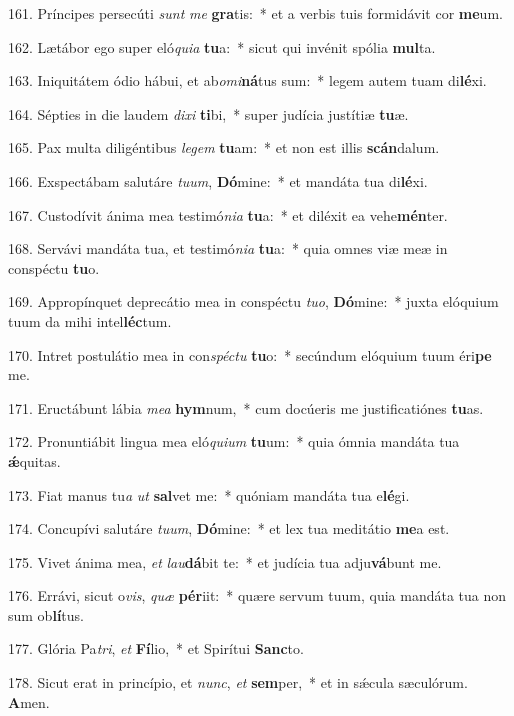161. Príncipes persecúti \textit{sunt} \textit{me} \textbf{gra}tis:~*  et a verbis tuis formidávit cor \textbf{me}um.\

162. Lætábor ego super eló\textit{qui}\textit{a} \textbf{tu}a:~*  sicut qui invénit spólia \textbf{mul}ta.\

163. Iniquitátem ódio hábui, et ab\textit{o}\textit{mi}\textbf{ná}tus sum:~*  legem autem tuam di\textbf{lé}xi.\

164. Sépties in die laudem \textit{di}\textit{xi} \textbf{ti}bi,~*  super judícia justítiæ \textbf{tu}æ.\

165. Pax multa diligéntibus \textit{le}\textit{gem} \textbf{tu}am:~*  et non est illis \textbf{scán}dalum.\

166. Exspectábam salutáre \textit{tu}\textit{um}, \textbf{Dó}mine:~*  et mandáta tua di\textbf{lé}xi.\

167. Custodívit ánima mea testimó\textit{ni}\textit{a} \textbf{tu}a:~*  et diléxit ea vehe\textbf{mén}ter.\

168. Servávi mandáta tua, et testimó\textit{ni}\textit{a} \textbf{tu}a:~*  quia omnes viæ meæ in conspéctu \textbf{tu}o.\

169. Appropínquet deprecátio mea in conspéctu \textit{tu}\textit{o}, \textbf{Dó}mine:~*  juxta elóquium tuum da mihi intel\textbf{léc}tum.\

170. Intret postulátio mea in con\textit{spéc}\textit{tu} \textbf{tu}o:~*  secúndum elóquium tuum éri\textbf{pe} me.\

171. Eructábunt lábia \textit{me}\textit{a} \textbf{hym}num,~*  cum docúeris me justificatiónes \textbf{tu}as.\

172. Pronuntiábit lingua mea eló\textit{qui}\textit{um} \textbf{tu}um:~*  quia ómnia mandáta tua \textbf{ǽ}quitas.\

173. Fiat manus tu\textit{a} \textit{ut} \textbf{sal}vet me:~*  quóniam mandáta tua e\textbf{lé}gi.\

174. Concupívi salutáre \textit{tu}\textit{um}, \textbf{Dó}mine:~*  et lex tua meditátio \textbf{me}a est.\

175. Vivet ánima mea, \textit{et} \textit{lau}\textbf{dá}bit te:~*  et judícia tua adju\textbf{vá}bunt me.\

176. Errávi, sicut o\textit{vis}, \textit{quæ} \textbf{pér}iit:~*  quære servum tuum, quia mandáta tua non sum ob\textbf{lí}tus.\

177. Glória Pa\textit{tri}, \textit{et} \textbf{Fí}lio,~*  et Spirítui \textbf{Sanc}to.\

178. Sicut erat in princípio, et \textit{nunc}, \textit{et} \textbf{sem}per,~*  et in sǽcula sæculórum. \textbf{A}men.\

